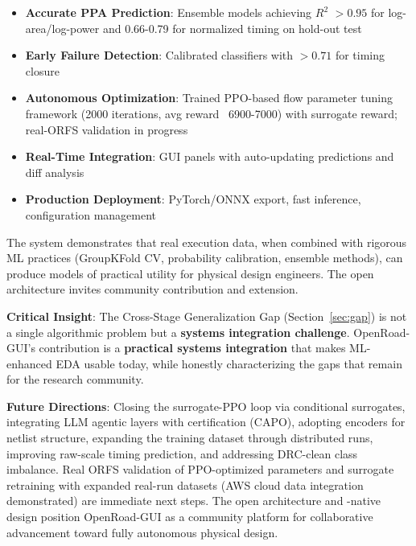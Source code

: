 \documentclass[10pt,conference]{IEEEtran}
\newcommand{\Rtwo}{$R^2$}
\newcommand{\ORFS}{\text{ORFS}}
\newcommand{\GNN}{\text{GNN}}
\newcommand{\AUC}{\text{AUC}}
\begin{document}
\begin{table}[t]
\begin{itemize}
    \item \textbf{Accurate PPA Prediction}: Ensemble models achieving \Rtwo{} $> 0.95$ for log-area/log-power and 0.66-0.79 for normalized timing on hold-out test
    \item \textbf{Early Failure Detection}: Calibrated classifiers with \AUC{} $> 0.71$ for timing closure
    \item \textbf{Autonomous Optimization}: Trained PPO-based flow parameter tuning framework (2000 iterations, avg reward ~6900-7000) with surrogate reward; real-ORFS validation in progress
    \item \textbf{Real-Time Integration}: GUI panels with auto-updating predictions and diff analysis
    \item \textbf{Production Deployment}: PyTorch/ONNX export, fast inference, configuration management
\end{itemize}

The system demonstrates that real \ORFS{} execution data, when combined with rigorous ML practices (GroupKFold CV, probability calibration, ensemble methods), can produce models of practical utility for physical design engineers. The open architecture invites community contribution and extension.

\textbf{Critical Insight}: The Cross-Stage Generalization Gap (Section~\ref{sec:gap}) is not a single algorithmic problem but a \textbf{systems integration challenge}. OpenRoad-GUI's contribution is a \textbf{practical systems integration} that makes ML-enhanced EDA usable today, while honestly characterizing the gaps that remain for the research community.

\textbf{Future Directions}: Closing the surrogate-PPO loop via conditional surrogates, integrating LLM agentic layers with certification (CAPO), adopting \GNN{} encoders for netlist structure, expanding the training dataset through distributed \ORFS{} runs, improving raw-scale timing prediction, and addressing DRC-clean class imbalance. Real ORFS validation of PPO-optimized parameters and surrogate retraining with expanded real-run datasets (AWS cloud data integration demonstrated) are immediate next steps. The open architecture and \ORFS{}-native design position OpenRoad-GUI as a community platform for collaborative advancement toward fully autonomous physical design.



\end{table}
\end{document}
